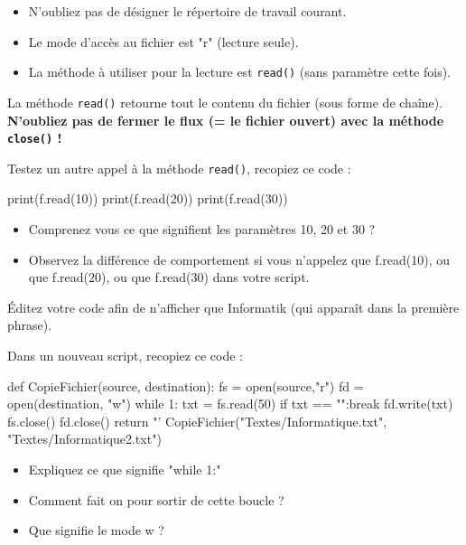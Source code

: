 \begin{itemize}
\item N'oubliez pas de désigner le répertoire de travail courant.
\item Le mode d'accès au fichier est "r" (lecture seule).
\item La méthode à utiliser pour la lecture est \texttt{read()} (sans paramètre cette fois).
\end{itemize}

 La méthode \texttt{read()} retourne tout le contenu du fichier (sous forme de chaîne). \textbf{N'oubliez pas de fermer le flux (= le fichier ouvert) avec la méthode \texttt{close()} !}

 Testez un autre appel à la méthode \texttt{read()}, recopiez ce code :
\begin{python}
print(f.read(10))
print(f.read(20))
print(f.read(30))
\end{python}

\begin{itemize}
\item Comprenez vous ce que signifient les paramètres 10, 20 et 30 ?
\item Observez la différence de comportement si vous n'appelez que f.read(10), ou que f.read(20), ou que f.read(30) dans votre script.
\end{itemize}
 Éditez votre code afin de n'afficher que Informatik (qui apparaît dans la
première phrase).

\exer

 Dans un nouveau script, recopiez ce code :
\begin{python}
def CopieFichier(source, destination):
  fs = open(source,"r")
  fd = open(destination, "w")
  while 1:
    txt = fs.read(50)
    if txt == "":break
    fd.write(txt)
  fs.close()
  fd.close()
  return "'%
CopieFichier("Textes/Informatique.txt", "Textes/Informatique2.txt")

\end{python}


\begin{itemize}
\item Expliquez ce que signifie "while 1:"
\item Comment fait on pour sortir de cette boucle ?
\item Que signifie le mode w ?
\end{itemize}

